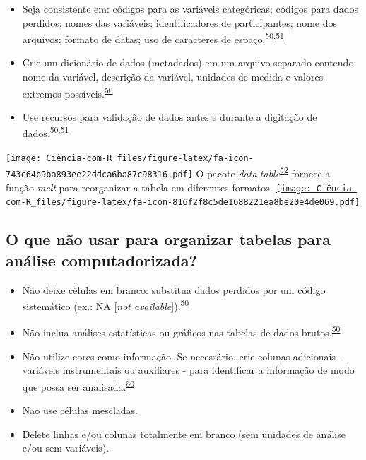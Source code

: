 \documentclass[
]{book}
\begin{document}
\begin{itemize}
\item
  Seja consistente em: códigos para as variáveis categóricas; códigos para dados perdidos; nomes das variáveis; identificadores de participantes; nome dos arquivos; formato de datas; uso de caracteres de espaço.\textsuperscript{\protect\hyperlink{ref-broman2018}{50},\protect\hyperlink{ref-Juluru2015}{51}}
\item
  Crie um dicionário de dados (metadados) em um arquivo separado contendo: nome da variável, descrição da variável, unidades de medida e valores extremos possíveis.\textsuperscript{\protect\hyperlink{ref-broman2018}{50}}
\item
  Use recursos para validação de dados antes e durante a digitação de dados.\textsuperscript{\protect\hyperlink{ref-broman2018}{50},\protect\hyperlink{ref-Juluru2015}{51}}
\end{itemize}

\texttt{[image: Ciência-com-R\_files/figure-latex/fa-icon-743c64b9ba893ee22ddca6ba87c98316.pdf]} O pacote \emph{data.table}\textsuperscript{\protect\hyperlink{ref-data.table}{52}} fornece a função \emph{melt} para reorganizar a tabela em diferentes formatos. \href{https://cran.r-project.org/web/packages/data.table/index.html}{\texttt{[image: Ciência-com-R\_files/figure-latex/fa-icon-816f2f8c5de1688221ea8be20e4de069.pdf]}}

\hypertarget{o-que-nuxe3o-usar-para-organizar-tabelas-para-anuxe1lise-computadorizada}{%
\subsection{O que não usar para organizar tabelas para análise computadorizada?}\label{o-que-nuxe3o-usar-para-organizar-tabelas-para-anuxe1lise-computadorizada}}

\begin{itemize}
\item
  Não deixe células em branco: substitua dados perdidos por um código sistemático (ex.: NA {[}\emph{not available}{]}).\textsuperscript{\protect\hyperlink{ref-broman2018}{50}}
\item
  Não inclua análises estatísticas ou gráficos nas tabelas de dados brutos.\textsuperscript{\protect\hyperlink{ref-broman2018}{50}}
\item
  Não utilize cores como informação. Se necessário, crie colunas adicionais - variáveis instrumentais ou auxiliares - para identificar a informação de modo que possa ser analisada.\textsuperscript{\protect\hyperlink{ref-broman2018}{50}}
\item
  Não use células mescladas.
\item
  Delete linhas e/ou colunas totalmente em branco (sem unidades de análise e/ou sem variáveis).
\end{itemize}
\end{document}
